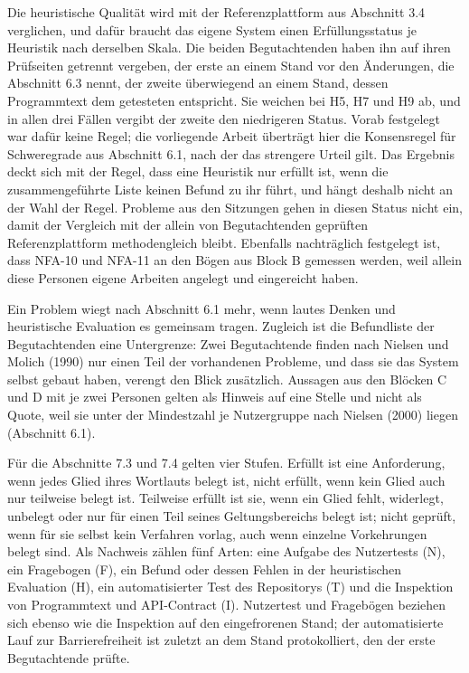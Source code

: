 Die heuristische Qualität wird mit der Referenzplattform aus Abschnitt 3.4 verglichen, und dafür braucht das eigene System einen Erfüllungsstatus je Heuristik nach derselben Skala. Die beiden Begutachtenden haben ihn auf ihren Prüfseiten getrennt vergeben, der erste an einem Stand vor den Änderungen, die Abschnitt 6.3 nennt, der zweite überwiegend an einem Stand, dessen Programmtext dem getesteten entspricht. Sie weichen bei H5, H7 und H9 ab, und in allen drei Fällen vergibt der zweite den niedrigeren Status. Vorab festgelegt war dafür keine Regel; die vorliegende Arbeit überträgt hier die Konsensregel für Schweregrade aus Abschnitt 6.1, nach der das strengere Urteil gilt. Das Ergebnis deckt sich mit der Regel, dass eine Heuristik nur erfüllt ist, wenn die zusammengeführte Liste keinen Befund zu ihr führt, und hängt deshalb nicht an der Wahl der Regel. Probleme aus den Sitzungen gehen in diesen Status nicht ein, damit der Vergleich mit der allein von Begutachtenden geprüften Referenzplattform methodengleich bleibt. Ebenfalls nachträglich festgelegt ist, dass NFA-10 und NFA-11 an den Bögen aus Block B gemessen werden, weil allein diese Personen eigene Arbeiten angelegt und eingereicht haben.

Ein Problem wiegt nach Abschnitt 6.1 mehr, wenn lautes Denken und heuristische Evaluation es gemeinsam tragen. Zugleich ist die Befundliste der Begutachtenden eine Untergrenze: Zwei Begutachtende finden nach Nielsen und Molich (1990) nur einen Teil der vorhandenen Probleme, und dass sie das System selbst gebaut haben, verengt den Blick zusätzlich. Aussagen aus den Blöcken C und D mit je zwei Personen gelten als Hinweis auf eine Stelle und nicht als Quote, weil sie unter der Mindestzahl je Nutzergruppe nach Nielsen (2000) liegen (Abschnitt 6.1).

Für die Abschnitte 7.3 und 7.4 gelten vier Stufen. Erfüllt ist eine Anforderung, wenn jedes Glied ihres Wortlauts belegt ist, nicht erfüllt, wenn kein Glied auch nur teilweise belegt ist. Teilweise erfüllt ist sie, wenn ein Glied fehlt, widerlegt, unbelegt oder nur für einen Teil seines Geltungsbereichs belegt ist; nicht geprüft, wenn für sie selbst kein Verfahren vorlag, auch wenn einzelne Vorkehrungen belegt sind. Als Nachweis zählen fünf Arten: eine Aufgabe des Nutzertests (N), ein Fragebogen (F), ein Befund oder dessen Fehlen in der heuristischen Evaluation (H), ein automatisierter Test des Repositorys (T) und die Inspektion von Programmtext und API-Contract (I). Nutzertest und Fragebögen beziehen sich ebenso wie die Inspektion auf den eingefrorenen Stand; der automatisierte Lauf zur Barrierefreiheit ist zuletzt an dem Stand protokolliert, den der erste Begutachtende prüfte.

